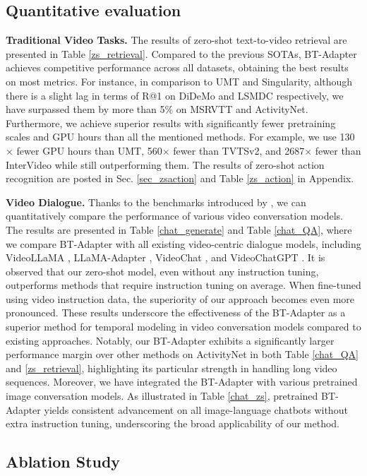 \documentclass{article} \usepackage{iclr2024_conference,times}
\begin{document}
\subsection{Quantitative evaluation} 
\textbf{Traditional Video Tasks.}
The results of zero-shot text-to-video retrieval are presented in Table \ref{zs_retrieval}. Compared to the previous SOTAs, BT-Adapter achieves competitive performance across all datasets, obtaining the best results on most metrics. For instance, in comparison to UMT and Singularity, although there is a slight lag in terms of R@1 on DiDeMo and LSMDC respectively, we have surpassed them by more than 5\% on MSRVTT and ActivityNet. Furthermore, we achieve superior results with significantly fewer pretraining scales and GPU hours than all the mentioned methods. For example, we use 130$\times$ fewer GPU hours than UMT, 560$\times$ fewer than TVTSv2, and 2687$\times$ fewer than InterVideo while still outperforming them. The results of zero-shot action recognition are posted in Sec. \ref{sec_zsaction} and Table \ref{zs_action} in Appendix.


\textbf{Video Dialogue.} 
Thanks to the benchmarks introduced by \citet{maaz2023video}, we can quantitatively compare the performance of various video conversation models. The results are presented in Table \ref{chat_generate} and Table \ref{chat_QA}, where we compare BT-Adapter with all existing video-centric dialogue models, including VideoLLaMA \citep{zhang2023video}, LLaMA-Adapter \citep{gao2023llama}, VideoChat \citep{li2023videochat}, and VideoChatGPT \citep{maaz2023video}. It is observed that our zero-shot model, even without any instruction tuning, outperforms methods that require instruction tuning on average. When fine-tuned using video instruction data, the superiority of our approach becomes even more pronounced. These results underscore the effectiveness of the BT-Adapter as a superior method for temporal modeling in video conversation models compared to existing approaches. Notably, our BT-Adapter exhibits a significantly larger performance margin over other methods on ActivityNet in both Table \ref{chat_QA} and \ref{zs_retrieval}, highlighting its particular strength in handling long video sequences. Moreover, we have integrated the BT-Adapter with various pretrained image conversation models. As illustrated in Table \ref{chat_zs}, pretrained BT-Adapter yields consistent advancement on all image-language chatbots without extra instruction tuning, underscoring the broad applicability of our method.

\subsection{Ablation Study} 
\end{document}
